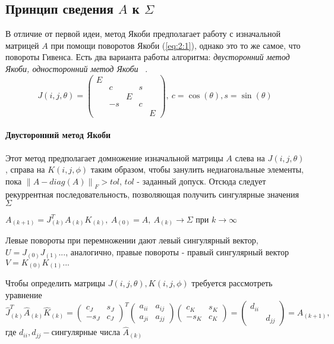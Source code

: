 \subsection{Принцип сведения $A$ к $\Sigma$}
В отличие от первой идеи, метод Якоби предполагает работу с изначальной матрицей $A$ при помощи поворотов Якоби (\ref{eq:2:1}), однако это то же самое, что повороты Гивенса. Есть два варианта работы алгоритма:\textit{ двусторонний метод Якоби, односторонний метод Якоби} ~\cite{Dongarra2018}.
\begin{equation} \label{eq:2:1}
    J(i,j,\theta) = 
    \begin{pmatrix}E&&&&\\
        &c&&s\\
        &&E&&\\
        &-s&&c\\
        &&&&E
    \end{pmatrix},\
    c = \cos(\theta), s =\sin(\theta) 
\end{equation}
\paragraph{Двусторонний метод Якоби}
Этот метод предполагает домножение изначальной матрицы $A$ слева на $J(i,j,\theta)$, справа на $K(i,j,\phi)$ таким образом, чтобы занулить недиагональные элементы, пока $\left\| A - diag(A) \right\|_F > tol$, $tol$ - заданный допуск. 
Отсюда следует рекуррентная последовательность, позволяющая получить сингулярные значения $\Sigma$
\begin{center}
    $A_{(k+1)} = J^T_{(k)}A_{(k)}K_{(k)}, \ A_{(0)}= A, \ A_{(k)}\longrightarrow\Sigma \text{ при } k\to\infty$
\end{center}

Левые повороты при перемножении дают левый сингулярный вектор, $U=J_{(0)}J_{(1)}...$, аналогично, правые повороты - правый сингулярный вектор $V=K_{(0)}K_{(1)}...$

Чтобы определить матрицы $J(i,j,\theta), K(i,j,\phi)$ требуется рассмотреть уравнение
\begin{equation}
    \hat{J}_{(k)}^T\hat{A}_{(k)}\hat{K}_{(k)} = \begin{pmatrix}
        c_J&s_J\\
        -s_J&c_J
    \end{pmatrix}^T
    \begin{pmatrix}
        a_{ii}&a_{ij}\\
        a_{ji}&a_{jj}
    \end{pmatrix}
    \begin{pmatrix}
        c_K&s_K\\
        -s_K&c_K
    \end{pmatrix} = \begin{pmatrix}
        d_{ii} &\\
        &d_{jj}
    \end{pmatrix} = A_{(k+1)},
\end{equation}
где $d_{ii}, d_{jj} -\text{сингулярные числа } \hat{A}_{(k)}$

